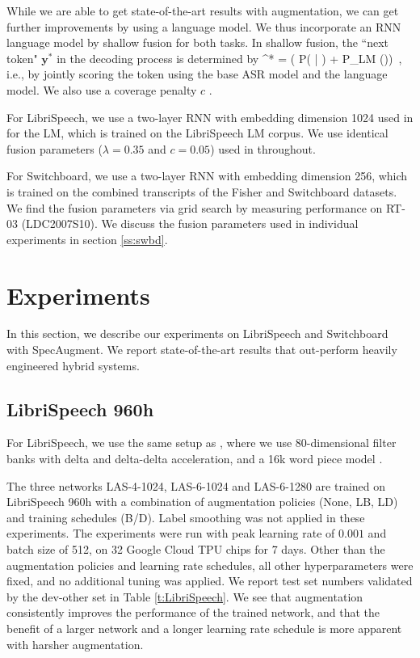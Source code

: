 While we are able to get state-of-the-art results with augmentation, we can get further improvements by using a language model. We thus incorporate an RNN language model by shallow fusion for both tasks. In shallow fusion, the ``next token" $\mathbf{y}^*$ in the decoding process is determined by
\be
{}^* =  \left( \log P( | ) + \lambda \log P_{LM} ()\right) \,,
\ee
i.e., by jointly scoring the token using the base ASR model and the language model. We also use a coverage penalty $c$ \cite{chorowski-2017-interspeech}.

For LibriSpeech, we use a two-layer RNN with embedding dimension 1024 used in \cite{irie-arxiv-2019} for the LM, which is trained on the LibriSpeech LM corpus. We use identical fusion parameters ($\lambda =0.35$ and $c=0.05$) used in \cite{irie-arxiv-2019} throughout.

For Switchboard, we use a two-layer RNN with embedding dimension 256, which is trained on the combined transcripts of the Fisher and Switchboard datasets. We find the fusion parameters via grid search by measuring performance on RT-03 (LDC2007S10). We discuss the fusion parameters used in individual experiments in section \ref{ss:swbd}.

\section{Experiments}

In this section, we describe our experiments on LibriSpeech and Switchboard with SpecAugment. We report state-of-the-art results that out-perform heavily engineered hybrid systems.

\subsection{LibriSpeech 960h} \label{ss:librispeech}

For LibriSpeech, we use the  same setup as \cite{irie-arxiv-2019}, where we use 80-dimensional filter banks with delta and delta-delta acceleration, and a 16k word piece model \cite{schuster-icassp-2012}.

The three networks LAS-4-1024, LAS-6-1024 and LAS-6-1280 are trained on LibriSpeech 960h with a combination of augmentation policies (None, LB, LD) and training schedules (B/D). Label smoothing was not applied in these experiments. The experiments were run with peak learning rate of $0.001$ and batch size of 512, on 32 Google Cloud TPU chips for 7 days. Other than the augmentation policies and learning rate schedules, all other hyperparameters were fixed, and no additional tuning was applied. We report test set numbers validated by the dev-other set in Table \ref{t:LibriSpeech}. We see that augmentation consistently improves the performance of the trained network, and that the benefit of a larger network and a longer learning rate schedule is more apparent with harsher augmentation.


